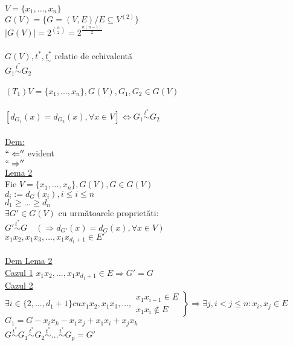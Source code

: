 \documentclass[12pt]{extarticle}
\begin{document}
	{\large
		$V = \{ x_{1}, ..., x_{n} \}$ \\
		$G(V) = \{ G = (V, E) / E \subseteq V^{(2)} \}$ \\
		$|G(V)| = 2^{\binom{n}{2}} = 2^{\frac{n(n - 1)}{2}}$ \\
		\\
		$G(V), t^{*}, \underset{\sim}{t^{*}}$ relatie de echivalentă \\
		$G_{1} \overset{t^{*}}{\sim} G_{2}$ \\
		\\
		$(T_{1}) V = \{ x_{1}, ..., x_{n} \}, G(V), G_{1}, G_{2} \in G(V)$ \\
		\\
		$[d_{G_{1}}(x) = d_{G_{2}}(x), \forall x \in V] \Leftrightarrow G_{1} \overset{t^{*}}{\sim} G_{2}$ \\
		\\
		\underline{Dem:} \\
		$``\Leftarrow''$ evident \\
		$``\Rightarrow''$ \\
		\underline{Lema 2} \\
		Fie $V = \{ x_{1}, ..., x_{n} \}, G(V), G \in G(V)$ \\
		$d_{i} := d_{G}(x_{i}), i \leq i \leq n$ \\
		$d_{1} \geq ... \geq d_{n}$ \\
		$\exists G' \in G(V)$ cu următoarele proprietăti: \\
		$G' \overset{t^{*}}{\sim} G \quad (\Rightarrow d_{G'}(x) = d_{G}(x), \forall x \in V)$ \\
		$x_{1}x_{2}, x_{1}x_{3}, ..., x_{1}x_{d_{1} + 1} \in E'$ \\
		\\
		\underline{Dem Lema 2} \\
		\underline{Cazul 1} $x_{1}x_{2}, ..., x_{1}x_{d_{1} + 1} \in E \Rightarrow G' = G$ \\
		\underline{Cazul 2} $\exists i \in \{ 2, ..., d_{1} + 1 \} cu x_{1}x_{2}, x_{1}x_{3}, ...,  
		\left.\begin{matrix}
		x_{1}x_{i - 1} \in E \\
		x_{1}x_{i} \notin E
		\end{matrix}\right\} \Rightarrow \exists j, i < j \leq n : x_{i}, x_{j} \in E$ \\
		$G_{1} = G - x_{i}x_{k} - x_{1}x_{j} + x_{1}x_{i} + x_{j}x_{k}$ \\
		$G \overset{t^{*}}{\sim} G_{1} \overset{t^{*}}{\sim} G_{2} \overset{t^{*}}{\sim} ... \overset{t^{*}}{\sim} G_{p} = G'$ \\
		
}
\end{document}
